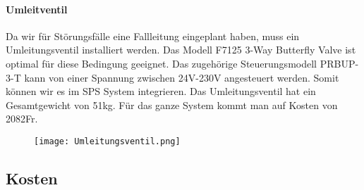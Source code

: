 
\paragraph{Umleitventil}

Da wir für Störungsfälle eine Fallleitung eingeplant haben, muss ein Umleitungsventil installiert werden. Das Modell F7125 3-Way Butterfly Valve ist optimal für diese Bedingung geeignet. Das zugehörige Steuerungsmodell PRBUP-3-T kann von einer Spannung zwischen 24V-230V angesteuert werden. Somit können wir es im SPS System integrieren. Das Umleitungsventil hat ein Gesamtgewicht von 51\si{kg}. Für das ganze System kommt man auf Kosten von 2082\si{Fr}.

 \begin{figure} [H]
	\centering
	\texttt{[image: Umleitungsventil.png]}
	\label{fig:Umleitungsventil}
\end{figure}


\cite{Belimo}



\subsection{Kosten}

